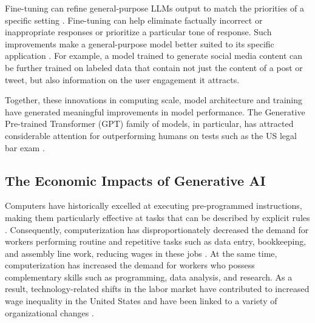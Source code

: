 \documentclass[11pt]{article}
\begin{document}
Fine-tuning can refine general-purpose LLMs output to match the priorities of a specific setting \citep{ouyangTrainingLanguageModels2022, liuSummaryChatGPTGPT42023}. Fine-tuning can help eliminate factually incorrect or inappropriate responses or prioritize a particular tone of response. Such improvements make a general-purpose model better suited to its specific application \citep{ouyangTrainingLanguageModels2022}. For example, a model trained to generate social media content can be further trained on labeled data that contain not just the content of a post or tweet, but also information on the user engagement it attracts. 

Together, these innovations in computing scale, model architecture and training have generated meaningful improvements in model performance. The Generative Pre-trained Transformer (GPT) family of models, in particular, has attracted considerable attention for outperforming humans on tests such as the US legal bar exam \citep{liuSummaryChatGPTGPT42023, bubeck2023sparks, GPT4TechnicalReport2023}.


\subsection{The Economic Impacts of Generative AI}\label{sec:aibackground}

Computers have historically excelled at executing pre-programmed instructions, making them particularly effective at tasks that can be described by explicit rules \citep{autorPolanyiParadoxShape2014}. Consequently, computerization has disproportionately decreased the demand for workers performing routine and repetitive tasks such as data entry, bookkeeping, and assembly line work, reducing wages in these jobs \citep{acemoglu2011skills}. At the same time, computerization has increased the demand for workers who possess complementary skills such as programming, data analysis, and research.  As a result, technology-related shifts in the labor market have contributed to increased wage inequality in the United States and have been linked to a variety of organizational changes \citep{katzChangesRelativeWages1992c, BrynHittJEP2000,  bres2002, 
autorSkillContentRecent, bakerMakeBuyTrucking2003,michaelsHasIctPolarized2014, oecd2023}.

\end{document}
